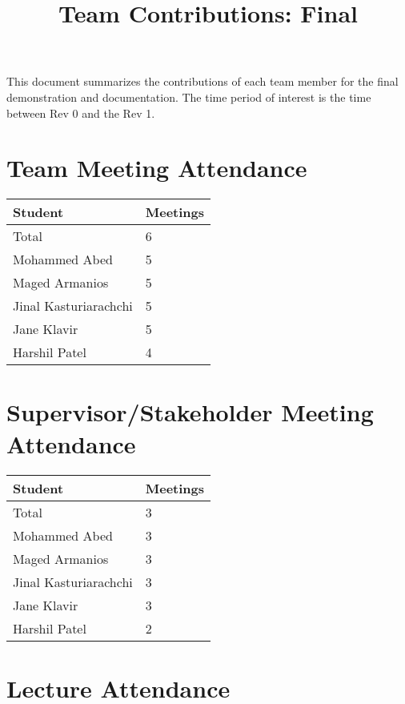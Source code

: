 \documentclass{article}
\title{Team Contributions: Final\\\progname}
\author{\authname}
\date{}
\begin{document}
\maketitle

This document summarizes the contributions of each team member for the final
demonstration and documentation.  The time period of interest is the time
between Rev 0 and the Rev 1.

\section{Team Meeting Attendance}

\begin{table}[H]
\centering
\begin{tabular}{ll}
\toprule
\textbf{Student} & \textbf{Meetings}\\
\midrule
Total & 6\\
Mohammed Abed & 5\\
Maged Armanios & 5\\
Jinal Kasturiarachchi & 5\\
Jane Klavir & 5\\
Harshil Patel & 4\\
\bottomrule
\end{tabular}
\end{table}


\section{Supervisor/Stakeholder Meeting Attendance}

\begin{table}[H]
\centering
\begin{tabular}{ll}
\toprule
\textbf{Student} & \textbf{Meetings}\\
\midrule
Total & 3\\
Mohammed Abed & 3\\
Maged Armanios & 3\\
Jinal Kasturiarachchi & 3\\
Jane Klavir & 3\\
Harshil Patel & 2\\
\bottomrule
\end{tabular}
\end{table}


\section{Lecture Attendance}
\end{document}
